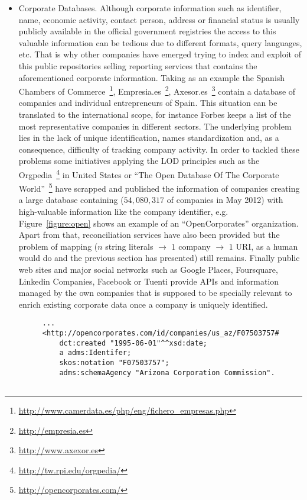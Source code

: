 \documentclass{llncs}
\begin{document}
\begin{itemize}
 
 \item Corporate Databases. Although corporate information such as identifier, name, economic activity, contact person, address or 
 financial status is usually publicly available in the official government registries the access to this valuable information can be 
 tedious due to different formats, query languages, etc. That is why other companies have emerged trying to index and exploit of 
 this public repositories selling reporting services that contains the aforementioned corporate information. Taking as 
 an example the Spanish Chambers of Commerce~\footnote{\url{http://www.camerdata.es/php/eng/fichero\_empresas.php}},
 Empresia.es~\footnote{\url{http://empresia.es}}, Axesor.es~\footnote{\url{http://www.axexor.es}} contain a database of companies and individual 
 entrepreneurs of Spain. This situation can be translated to the international scope, for instance Forbes keeps a list of 
 the most representative companies in different sectors. The underlying problem lies in the lack of unique identification, 
 names standardization and, as a consequence, difficulty of tracking company activity. In order to tackled these problems some 
 initiatives applying the LOD principles such as the Orgpedia~\footnote{\url{http://tw.rpi.edu/orgpedia/}} in United States or 
 ``The Open Database Of The Corporate World''~\footnote{\url{http://opencorporates.com/}} have scrapped and published the information 
 of companies creating a large database containing ($54,080,317$ of companies in May 2012) with high-valuable information like the company 
 identifier, e.g. Figure~\ref{figure:open} shows an example of an ``OpenCorporates'' organization. 
 Apart from that, reconciliation services have also been provided but the problem of mapping ($n$ string literals $\to$ $1$ company $\to$ $1$ URI, 
 as a human would do and the previous section has presented) still remains. Finally public web sites and major social networks such as Google 
 Places, Foursquare, Linkedin Companies, Facebook or Tuenti provide APIs and information managed by the own companies that is supposed 
 to be specially relevant to enrich existing corporate data once a company is uniquely identified.
 
  
 
\begin{figure}[!h]
\begin{center}
\begin{lstlisting}[language=SPARQL]
...
<http://opencorporates.com/id/companies/us_az/F07503757#id> 
	dct:created "1995-06-01"^^xsd:date;
	a adms:Identifer;
	skos:notation "F07503757";
	adms:schemaAgency "Arizona Corporation Commission".


\end{lstlisting}
\end{center}
\end{figure}
\end{itemize}
\end{document}
